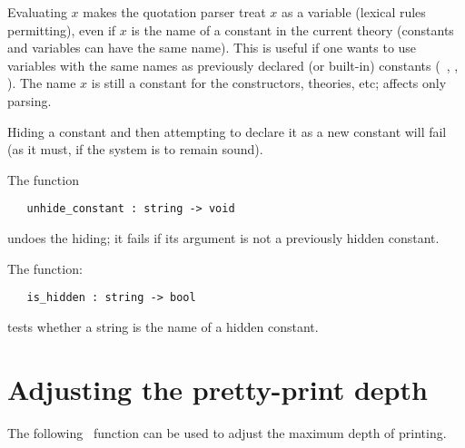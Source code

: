 \noindent Evaluating $x$
makes the quotation parser treat $x$ as a variable (lexical
rules permitting), even if $x$ is the name of a constant in the current theory
(constants and variables can have the same name).
This is useful if one wants to use variables  with the same names
as previously declared (or built-in) constants (\eg\ , , 
\etc).
The name $x$ is still a
constant for the constructors, theories, etc; 
affects only  parsing.

Hiding a constant and then attempting to declare it as a new
constant will fail (as it must, if the system is to remain sound).

The function

\begin{boxed}
\begin{verbatim}
   unhide_constant : string -> void
\end{verbatim}\end{boxed}

\noindent undoes the hiding; it fails if its argument is not a previously
hidden constant.

The function:

\begin{boxed}
\begin{verbatim}
   is_hidden : string -> bool
\end{verbatim}\end{boxed}

\noindent tests whether a string is the name of a hidden constant.

\section{Adjusting the pretty-print depth}

The following \ML\ function  can be used to adjust the maximum depth of
printing.

